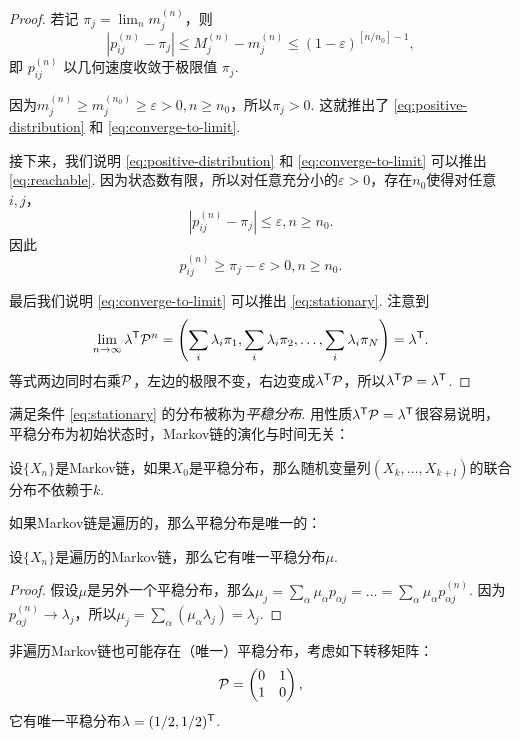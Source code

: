 \begin{proof}
若记 $\pi_j = \lim _n m_j^{(n)}$，则
\[
\left|p_{i j}^{(n)} - \pi_j\right| \leq M_j^{(n)} - m_j^{(n)} \leq (1-\varepsilon)^{\left[n / n_0\right] - 1},
\]
即 $p_{i j}^{(n)}$ 以几何速度收敛于极限值 $\pi_j$. 

因为$m_j^{(n)} \geqslant m_j^{\left(n_0\right)} \geqslant \varepsilon > 0, n \geqslant n_0$，所以$\pi_j > 0$. 这就推出了 \eqref{eq:positive-distribution} 和 \eqref{eq:converge-to-limit}. 

接下来，我们说明 \eqref{eq:positive-distribution} 和 \eqref{eq:converge-to-limit} 可以推出 \eqref{eq:reachable}.  因为状态数有限，所以对任意充分小的$\varepsilon > 0$，存在$n_0$使得对任意$i,j$，
\[
\left|p_{i j}^{(n)} - \pi_j\right| \leq \varepsilon, n \geq n_0.
\]
因此
\[
p_{i j}^{(n)} \geq \pi_j - \varepsilon > 0, n \geq n_0.
\]

最后我们说明 \eqref{eq:converge-to-limit} 可以推出 \eqref{eq:stationary}. 注意到
\[
\lim_{n \to \infty} \lambda^{\mathsf{T}} \mathcal P^n = \left(\sum_i \lambda_i \pi_1, \sum_i \lambda_i \pi_2, \ldots, \sum_i \lambda_i \pi_N\right)=\lambda^{\mathsf{T}}.
\]
等式两边同时右乘$\mathcal P$，左边的极限不变，右边变成$\lambda^{\mathsf{T}} \mathcal P$，所以$\lambda^{\mathsf{T}} \mathcal P = \lambda^{\mathsf{T}}$.
\end{proof}

满足条件 \eqref{eq:stationary} 的分布被称为\textit{平稳分布}. 用性质$\lambda^{\mathsf{T}} \mathcal P = \lambda^{\mathsf{T}}$很容易说明，平稳分布为初始状态时，Markov链的演化与时间无关：
\begin{proposition}\label{prop:stationary-distribution}
设$\{X_n\}$是Markov链，如果$X_0$是平稳分布，那么随机变量列$(X_k,\dots,X_{k+l})$的联合分布不依赖于$k$.
\end{proposition}

如果Markov链是遍历的，那么平稳分布是唯一的：
\begin{proposition}\label{prop:unique-stationary-distribution}
设$\{X_n\}$是遍历的Markov链，那么它有唯一平稳分布$\mu$. 
\end{proposition}
    \begin{proof}
        假设$\mu$是另外一个平稳分布，那么$\mu_j=\sum_\alpha\mu_\alpha p_{\alpha j}=\dots=\sum_{\alpha}\mu_\alpha p_{\alpha j}^{(n)}$. 因为$p_{\alpha j}^{(n)}\to \lambda_j$，所以$\mu_j=\sum_{\alpha} (\mu_\alpha\lambda_j)=\lambda_j$.
    \end{proof}

非遍历Markov链也可能存在（唯一）平稳分布，考虑如下转移矩阵：
\[\mathcal P=\begin{pmatrix}0&1\\1&0\end{pmatrix},\]
它有唯一平稳分布$\lambda=(1/2,1/2)^{\mathsf{T}}$.

